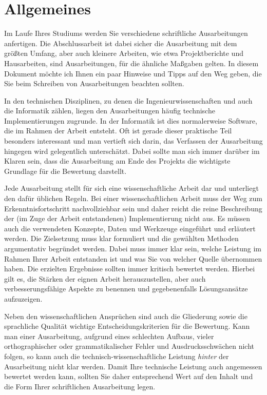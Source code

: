 
\section{Allgemeines}

Im Laufe Ihres Studiums werden Sie verschiedene schriftliche Ausarbeitungen anfertigen.
Die Abschlussarbeit ist dabei sicher die Ausarbeitung mit dem größten Umfang, aber auch kleinere Arbeiten, wie etwa Projektberichte und Hausarbeiten, sind Ausarbeitungen, für die ähnliche Maßgaben gelten.
In diesem Dokument möchte ich Ihnen ein paar Hinweise und Tipps auf den Weg geben, die Sie beim Schreiben von Ausarbeitungen beachten sollten.

In den technischen Disziplinen, zu denen die Ingenieurwissenschaften und auch die Informatik zählen, liegen den Ausarbeitungen häufig technische Implementierungen zugrunde.
In der Informatik ist dies normalerweise Software, die im Rahmen der Arbeit entsteht.
Oft ist gerade dieser praktische Teil besonders interessant und man vertieft sich darin,  das Verfassen der Ausarbeitung hingegen wird gelegentlich unterschätzt.
Dabei sollte man sich immer darüber im Klaren sein, dass die Ausarbeitung am Ende des Projekts die wichtigste Grundlage für die Bewertung darstellt.

Jede Ausarbeitung stellt für sich eine wissenschaftliche Arbeit dar und unterliegt den dafür üblichen Regeln.
Bei einer wissenschaftlichen Arbeit muss der Weg zum Erkenntnisfortschritt nachvollziehbar sein und daher reicht die reine Beschreibung der (im Zuge der Arbeit entstandenen) Implementierung nicht aus. 
Es müssen auch die verwendeten Konzepte, Daten und Werkzeuge eingeführt und erläutert werden.
Die Zielsetzung muss klar formuliert und die gewählten Methoden argumentativ begründet werden.
Dabei muss immer klar sein, welche Leistung im Rahmen Ihrer Arbeit entstanden ist und was Sie von welcher Quelle übernommen haben.
Die erzielten Ergebnisse sollten immer kritisch bewertet werden. 
Hierbei gilt es, die Stärken der eignen Arbeit herauszustellen, aber auch verbesserungsfähige Aspekte zu benennen und gegebenenfalls Lösungsansätze aufzuzeigen.

Neben den wissenschaftlichen Ansprüchen sind auch die Gliederung sowie die sprachliche Qualität wichtige Entscheidungskriterien für die Bewertung.
Kann man einer Ausarbeitung, aufgrund eines schlechten Aufbaus, vieler orthographischer oder grammatikalischer Fehler und Ausdrucksschwächen nicht folgen, so kann auch die  technisch-wissenschaftliche Leistung \textit{hinter} der Ausarbeitung nicht klar werden.
Damit Ihre technische Leistung auch angemessen bewertet werden kann, sollten Sie daher entsprechend Wert auf den Inhalt und die Form Ihrer schriftlichen Ausarbeitung legen.

